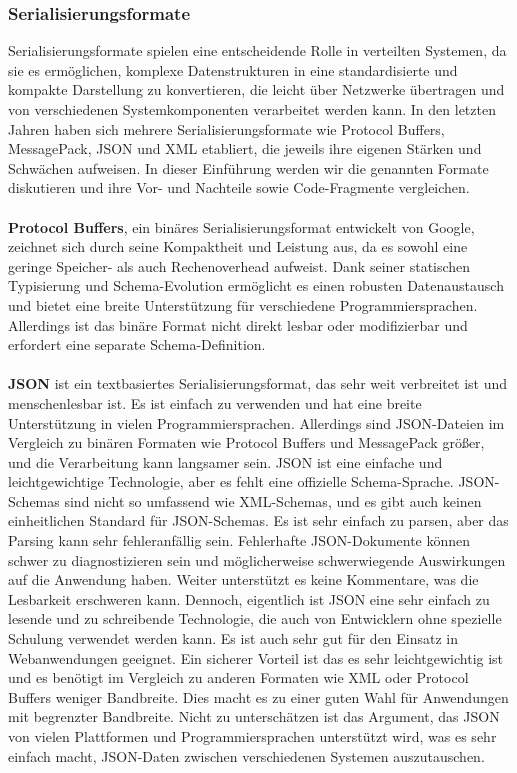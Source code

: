 \subsubsection{Serialisierungsformate}

Serialisierungsformate spielen eine entscheidende Rolle in verteilten Systemen, da sie es ermöglichen, komplexe Datenstrukturen in eine standardisierte und kompakte Darstellung zu konvertieren, die leicht über Netzwerke übertragen und von verschiedenen Systemkomponenten verarbeitet werden kann. In den letzten Jahren haben sich mehrere Serialisierungsformate wie Protocol Buffers, MessagePack, JSON und XML etabliert, die jeweils ihre eigenen Stärken und Schwächen aufweisen. In dieser Einführung werden wir die genannten Formate diskutieren und ihre Vor- und Nachteile sowie Code-Fragmente vergleichen.
\\\\
\textbf{Protocol Buffers}, ein binäres Serialisierungsformat entwickelt von Google, zeichnet sich durch seine Kompaktheit und Leistung aus, da es sowohl eine geringe Speicher- als auch Rechenoverhead aufweist. Dank seiner statischen Typisierung und Schema-Evolution ermöglicht es einen robusten Datenaustausch und bietet eine breite Unterstützung für verschiedene Programmiersprachen. Allerdings ist das binäre Format nicht direkt lesbar oder modifizierbar und erfordert eine separate Schema-Definition.
\\\\
\textbf{JSON} ist ein textbasiertes Serialisierungsformat, das sehr weit verbreitet ist und menschenlesbar ist. Es ist einfach zu verwenden und hat eine breite Unterstützung in vielen Programmiersprachen. Allerdings sind JSON-Dateien im Vergleich zu binären Formaten wie Protocol Buffers und MessagePack größer, und die Verarbeitung kann langsamer sein.
JSON ist eine einfache und leichtgewichtige Technologie, aber es fehlt eine offizielle Schema-Sprache. JSON-Schemas sind nicht so umfassend wie XML-Schemas, und es gibt auch keinen einheitlichen Standard für JSON-Schemas. Es ist sehr einfach zu parsen, aber das Parsing kann sehr fehleranfällig sein. Fehlerhafte JSON-Dokumente können schwer zu diagnostizieren sein und möglicherweise schwerwiegende Auswirkungen auf die Anwendung haben. Weiter unterstützt es keine Kommentare, was die Lesbarkeit erschweren kann.
Dennoch, eigentlich ist JSON eine sehr einfach zu lesende und zu schreibende Technologie, die auch von Entwicklern ohne spezielle Schulung verwendet werden kann. Es ist auch sehr gut für den Einsatz in Webanwendungen geeignet.
Ein sicherer Vorteil ist das es sehr leichtgewichtig ist und es benötigt im Vergleich zu anderen Formaten wie XML oder Protocol Buffers weniger Bandbreite. Dies macht es zu einer guten Wahl für Anwendungen mit begrenzter Bandbreite.
Nicht zu unterschätzen ist das Argument, das JSON  von vielen Plattformen und Programmiersprachen unterstützt wird, was es sehr einfach macht, JSON-Daten zwischen verschiedenen Systemen auszutauschen.\\\\

